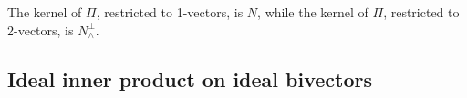 \documentclass[12pt]{article}
\newcommand{\mydogblue}{{\color{gray} $\square$~~}}
\begin{document}
 \myexercise  The kernel of $\Pi$, restricted to 1-vectors, is $N$, while the kernel of $\Pi$, restricted to 2-vectors, is $N_{\wedge}^{\perp}$. %

\subsection{Ideal inner product on ideal bivectors}
\end{document}
